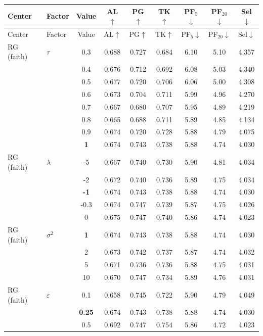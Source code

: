 \begin{longtable}{@{}l l c c c c c c c@{}}
\toprule
Center & Factor & Value & AL$\uparrow$ & PG$\uparrow$ & TK$\uparrow$ & PF$_5$$\downarrow$ & PF$_{20}$$\downarrow$ & Sel$\downarrow$ \\
\midrule
\endfirsthead
\toprule
Center & Factor & Value & AL$\uparrow$ & PG$\uparrow$ & TK$\uparrow$ & PF$_5$$\downarrow$ & PF$_{20}$$\downarrow$ & Sel$\downarrow$ \\
\midrule
\endhead
\bottomrule
\endlastfoot
RG (faith) & $\tau$ & 0.3 & 0.688 & 0.727 & 0.684 & 6.10 & 5.10 & 4.357 \\
 &  & 0.4 & 0.676 & 0.712 & 0.692 & 6.08 & 5.03 & 4.340 \\
 &  & 0.5 & 0.677 & 0.720 & 0.706 & 6.06 & 5.00 & 4.308 \\
 &  & 0.6 & 0.673 & 0.704 & 0.711 & 5.99 & 4.96 & 4.270 \\
 &  & 0.7 & 0.667 & 0.680 & 0.707 & 5.95 & 4.89 & 4.219 \\
 &  & 0.8 & 0.665 & 0.688 & 0.711 & 5.89 & 4.85 & 4.134 \\
 &  & 0.9 & 0.674 & 0.720 & 0.728 & 5.88 & 4.79 & 4.075 \\
 &  & \textbf{1} & 0.674 & 0.743 & 0.738 & 5.88 & 4.74 & 4.030 \\
\midrule
RG (faith) & $\lambda$ & {-}5 & 0.667 & 0.740 & 0.730 & 5.90 & 4.81 & 4.034 \\
 &  & {-}2 & 0.672 & 0.740 & 0.736 & 5.89 & 4.75 & 4.034 \\
 &  & \textbf{{-}1} & 0.674 & 0.743 & 0.738 & 5.88 & 4.74 & 4.030 \\
 &  & {-}0.3 & 0.674 & 0.747 & 0.739 & 5.87 & 4.75 & 4.026 \\
 &  & 0 & 0.675 & 0.747 & 0.740 & 5.86 & 4.74 & 4.023 \\
\midrule
RG (faith) & $\sigma^2$ & \textbf{1} & 0.674 & 0.743 & 0.738 & 5.88 & 4.74 & 4.030 \\
 &  & 2 & 0.673 & 0.742 & 0.737 & 5.87 & 4.74 & 4.032 \\
 &  & 5 & 0.671 & 0.736 & 0.736 & 5.88 & 4.75 & 4.031 \\
 &  & 10 & 0.670 & 0.747 & 0.734 & 5.89 & 4.76 & 4.031 \\
\midrule
RG (faith) & $\varepsilon$ & 0.1 & 0.658 & 0.745 & 0.722 & 5.90 & 4.79 & 4.049 \\
 &  & \textbf{0.25} & 0.674 & 0.743 & 0.738 & 5.88 & 4.74 & 4.030 \\
 &  & 0.5 & 0.692 & 0.747 & 0.754 & 5.86 & 4.72 & 4.023 \\

\end{longtable}
